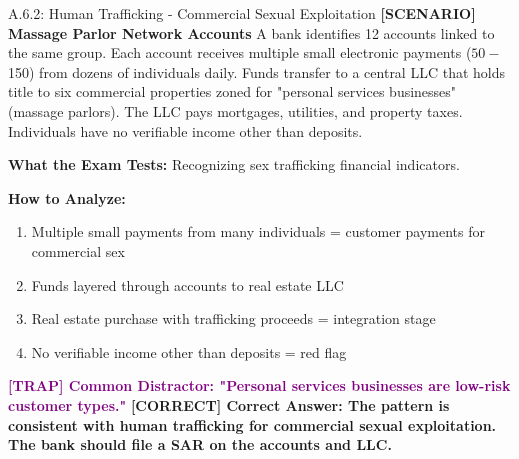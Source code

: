 \documentclass[11pt,a4paper]{beamer}
\newcommand{\trap}[1]{\textcolor{purple}{\textbf{[TRAP] #1}}}
\newcommand{\correct}[1]{\textcolor{green!50!black}{\textbf{[CORRECT] #1}}}
\newcommand{\scenario}[1]{\textcolor{blue!70!black}{\textbf{[SCENARIO] #1}}}
\begin{document}
	\begin{frame}{A.6.2: Human Trafficking - Commercial Sexual Exploitation}
		\scenario{Massage Parlor Network Accounts}
		A bank identifies 12 accounts linked to the same group. Each account receives multiple small electronic payments ($50-$150) from dozens of individuals daily. Funds transfer to a central LLC that holds title to six commercial properties zoned for "personal services businesses" (massage parlors). The LLC pays mortgages, utilities, and property taxes. Individuals have no verifiable income other than deposits.
		
		\vspace{0.1cm}
		\textbf{What the Exam Tests:} Recognizing sex trafficking financial indicators.
		
		\vspace{0.1cm}
		\textbf{How to Analyze:}
		\begin{enumerate}
			\item Multiple small payments from many individuals = customer payments for commercial sex
			\item Funds layered through accounts to real estate LLC
			\item Real estate purchase with trafficking proceeds = integration stage
			\item No verifiable income other than deposits = red flag
		\end{enumerate}
		
		\trap{Common Distractor: "Personal services businesses are low-risk customer types."}
		\correct{Correct Answer: The pattern is consistent with human trafficking for commercial sexual exploitation. The bank should file a SAR on the accounts and LLC.}
	\end{frame}
	
	
\end{document}

